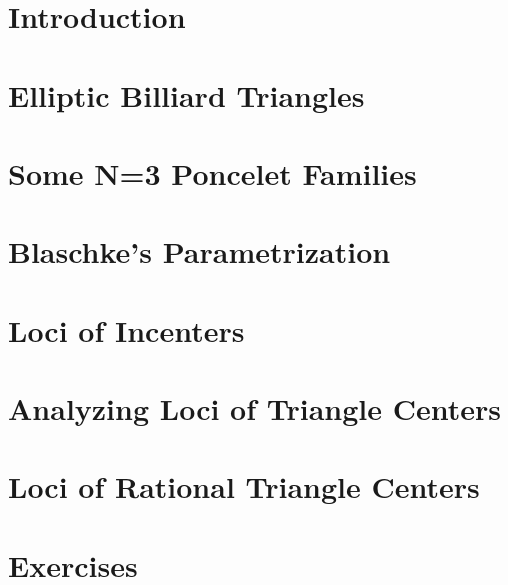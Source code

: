 \section{Introduction}
\label{sec:03-intro}


\section{Elliptic Billiard Triangles}
\label{sec:03-billiard}
 

\section{Some N=3 Poncelet Families}
\label{sec:03-families}
 

\section{Blaschke's Parametrization}
\label{sec:03-blaschke}
 

\section{Loci of Incenters}
\label{sec:03-proof_theorem}
 

\section{Analyzing Loci of Triangle Centers}
\label{sec:03-loci}
 



\section{Loci of Rational Triangle Centers}
\label{sec:03-rational-trilinears}
  

\section{Exercises}
\label{sec:03-exercises}

